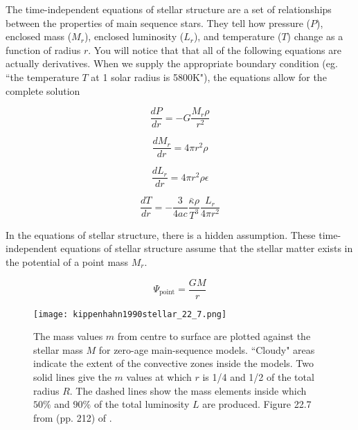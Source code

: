 \documentclass[12pt]{article} %
\numberwithin{equation}{section} %
\begin{document}
The time-independent equations of stellar structure  are a set of relationships between the properties of main sequence stars. They tell how pressure ($P$), enclosed mass ($M_{r}$), enclosed luminosity ($L_{r}$), and temperature ($T$) change as a function of radius $r$. You will notice that that all of the following equations are actually derivatives. When we supply the appropriate boundary condition (eg. ``the temperature $T$ at 1 solar radius is 5800K"), the equations allow for the complete solution

\begin{equation} \label{stellar_structure1}
\frac{dP}{dr} = -G \frac{M_{r} \rho}{r^{2}} 
\end{equation}

\begin{equation} \label{stellar_structure2}
\frac{dM_{r}}{dr} = 4 \pi r^{2} \rho
\end{equation}

\begin{equation} \label{stellar_structure3}
\frac{dL_{r}}{dr} = 4 \pi r^{2} \rho \epsilon
\end{equation}

\begin{equation} \label{stellar_structure4}
\frac{dT}{dr} = - \frac{3}{4ac} \frac{\bar{\kappa} \rho}{T^{3}} \frac{L_{r}}{4 \pi r^{2}}
\end{equation}

In the equations of stellar structure, there is a hidden assumption. These time-independent equations of stellar structure assume that the stellar matter exists in the potential of a point mass $M_{r}$. 

\begin{equation}
\Psi_{\text{point}} = \frac{GM}{r}
\end{equation}


\begin{figure}[H]
\centering
\texttt{[image: kippenhahn1990stellar\_22\_7.png]}
\caption{The mass values $m$ from centre to surface are plotted against the stellar mass $M$ for zero-age main-sequence models. ``Cloudy" areas indicate the extent of the convective zones inside the models. Two solid lines give the $m$ values at which $r$ is 1/4 and 1/2 of the total radius $R$. The dashed lines show the mass elements inside which $50\%$ and $90\%$ of the total luminosity $L$ are produced. Figure 22.7 from (pp. 212) of \citet{kippenhahn1990stellar}.}
\label{fig: kippenhahn1990stellar_22_7}
\end{figure}
\end{document}
